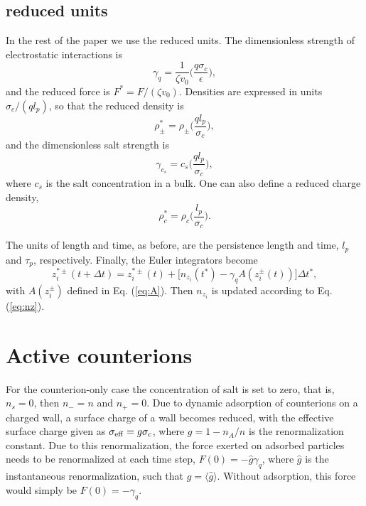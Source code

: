 \documentclass[pre,twocolumn,graphicx]{revtex4-1}
\newcommand{\be}{\begin{equation}}
\newcommand{\ee}{\end{equation}}
\begin{document}
\subsection{reduced units}
In the rest of the paper we use the reduced units.  The dimensionless strength of electrostatic interactions is
\be
\gamma_q = \frac{1}{\zeta v_0} \bigg(\frac{q\sigma_c}{\epsilon}\bigg),
\label{eq:gammaq}
\ee 
and the reduced force is $F^*=F/(\zeta v_0)$.  
Densities are expressed in units $\sigma_c/(ql_p)$, so that the reduced density is 
\be
\rho_{\pm}^* = \rho_{\pm}\bigg(\frac{ql_p}{\sigma_c}\bigg), 
\ee
and the dimensionless salt strength is 
\be
\gamma_{c_s} = c_s\bigg(\frac{ql_p}{\sigma_c}\bigg),
\ee
where $c_s$ is the salt concentration in a bulk.  One can also define a reduced charge density,
\be
\rho_{c}^* = \rho_{c}\bigg(\frac{l_p}{\sigma_c}\bigg).  
\ee

The units of length and time, as before, are the persistence length and time, $l_p$ and $\tau_p$, 
respectively.  
Finally, the Euler integrators become
\be
z_i^{* \pm}(t+\Delta t) = z_i^{* \pm}(t) + \Big[ n_{z_i}(t^*) - \gamma_q A(z_i^{\pm}(t)) \Big] \Delta t^*,
\ee
with $A(z_i^{\pm})$ defined in Eq. (\ref{eq:A}).  Then $n_{z_i}$ is updated according to Eq. (\ref{eq:nz}).  






\section{Active counterions}
\label{sec:ocp}


For the counterion-only case the concentration of salt is set to zero, that is, $n_s=0$, then $n_-=n$ and 
$n_+=0$.  Due to dynamic adsorption of counterions on a charged wall, a surface charge 
of a wall becomes reduced, with 
the effective surface charge given as $\sigma_{\rm eff}=g\sigma_c$, where $g=1-n_A/n$ is the 
renormalization constant.  Due to this renormalization, the force exerted on adsorbed particles needs
to be renormalized at each time step, $F(0) = -\hat g\gamma_q$, where $\hat g$ is the instantaneous 
renormalization, such that $g=\langle\hat g\rangle$.  Without adsorption, this force would simply be 
$F(0)=-\gamma_q$.
\end{document}
